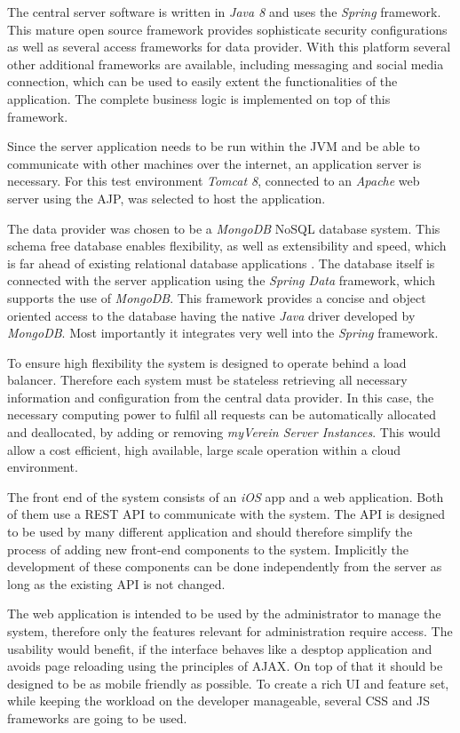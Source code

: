 The central server software is written in \emph{Java 8} and uses the \emph{Spring} framework. This mature open source framework provides sophisticate security configurations as well as several access frameworks for data provider. With this platform several other additional frameworks are available, including messaging and social media connection, which can be used to easily extent the functionalities of the application. The complete business logic is implemented on top of this framework.

Since the server application needs to be run within the \gls{JVM} and be able to communicate with other machines over the internet, an application server is necessary. For this test environment \emph{Tomcat 8}, connected to an \emph{Apache} web server using the \gls{AJP}, was selected to host the application.  

The data provider was chosen to be a \emph{MongoDB} \gls{NoSQL} database system. This schema free database enables flexibility, as well as extensibility and speed, which is far ahead of existing relational database applications \cite{Moschetti:2014aa}. The database itself is connected with the server application using the \emph{Spring Data} framework, which supports the use of \emph{MongoDB}. This framework provides a concise and object oriented access to the database having the native \emph{Java} driver developed by \emph{MongoDB}. Most importantly it integrates very well into the \emph{Spring} framework.

To ensure high flexibility the system is designed to operate behind a load balancer. Therefore each system must be stateless retrieving all necessary information and configuration from the central data provider. In this case, the necessary computing power to fulfil all requests can be automatically allocated and deallocated, by adding or removing \emph{myVerein Server Instances}. This would allow a cost efficient, high available, large scale operation within a cloud environment.  

The front end of the system consists of an \emph{iOS} app and a web application. Both of them use a \gls{REST} \gls{API} to communicate with the system. The \gls{API} is designed to be used by many different application and should therefore simplify the process of adding new front-end components to the system. Implicitly the development of these components can be done independently from the server as long as the existing \gls{API} is not changed.

The web application is intended to be used by the administrator to manage the system, therefore only the features relevant for administration require access. The usability would benefit, if the interface behaves like a desptop application and avoids page reloading using the principles of \gls{AJAX}. On top of that it should be designed to be as mobile friendly as possible. To create a rich \gls{UI} and feature set, while keeping the workload on the developer manageable, several \gls{CSS} and \gls{JS} frameworks are going to be used.

